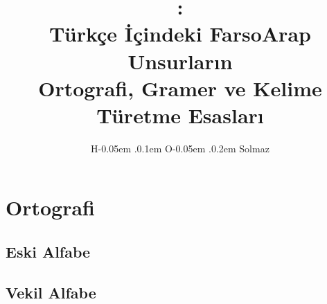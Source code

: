 \documentclass[a5paper,12pt]{scrbook}
\title{\Huge\fat:\\[0.6ex] \large Türkçe İçindeki FarsoArap Unsurların \\
  Ortografi, Gramer ve Kelime Türetme Esasları}
\author{H\kern -0.05em .\kern 0.1em O\kern -0.05em .\kern 0.2em Solmaz}
\date{}
\begin{document}
\maketitle
\tableofcontents

\chapter{Ortografi}

\section{Eski Alfabe}

\section{Vekil Alfabe}
\end{document}
